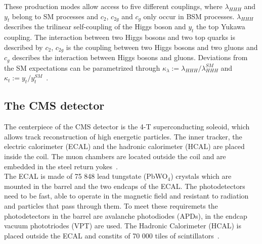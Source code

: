 
These production modes allow access to five different couplings, where $\lambda_{HHH}$ and $y_t$ belong to SM processes and $c_2$, $c_{2g}$ and $c_{g}$ only occur in BSM processes.
$\lambda_{HHH}$ describes the trilinear self-coupling of the Higgs boson and $y_t$ the top Yukawa coupling. The interaction between two Higgs bosons and two top quarks is described by $c_2$,
$c_{2g}$ is the coupling between two Higgs bosons and two gluons and  $c_{g}$ describes the interaction between Higgs bosons and gluons.
Deviations from the SM expectations
can be parametrized through $\kappa_{\lambda} := \lambda_{HHH}/\lambda_{HHH}^{SM}$ and $\kappa_{t} := y_{t}/y_{t}^{SM}$~\cite{CMS:2021qbp}. 

\subsection{The CMS detector}
\label{sec:cms_det}

The centerpiece of the CMS detector is the 4-T superconducting soleoid, which allows track reconstruction of high energetic particles. The inner tracker,
the electric calorimeter (ECAL) and the hadronic calorimeter (HCAL) are placed inside the coil. The muon chambers are located outside the coil and are embedded in the steel return yokes~\cite{CMS:2008}. \\

The ECAL is made of 75 848 lead tungstate (PbWO$_4$) crystals which are mounted in the barrel and the two endcaps of the ECAL. The photodetectors need to be fast, able to operate in the magnetic field and
resistant to radiation and particles that pass through them. To meet these requiremets the photodetectors in the barrel are avalanche photodiodes (APDs), in the endcap vacuum phototriodes (VPT) are used.
The Hadronic Calorimeter (HCAL) is placed outside the ECAL and constits of 70 000 tiles of scintillators~\cite{CMS:2008}. \\

